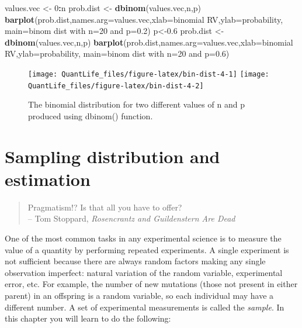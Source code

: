 \documentclass[
]{book}
\newenvironment{Shaded}{\begin{snugshade}}{\end{snugshade}}
\newcommand{\DataTypeTok}[1]{\textcolor[rgb]{0.13,0.29,0.53}{#1}}
\newcommand{\DecValTok}[1]{\textcolor[rgb]{0.00,0.00,0.81}{#1}}
\newcommand{\FloatTok}[1]{\textcolor[rgb]{0.00,0.00,0.81}{#1}}
\newcommand{\KeywordTok}[1]{\textcolor[rgb]{0.13,0.29,0.53}{\textbf{#1}}}
\newcommand{\NormalTok}[1]{#1}
\newcommand{\OperatorTok}[1]{\textcolor[rgb]{0.81,0.36,0.00}{\textbf{#1}}}
\newcommand{\StringTok}[1]{\textcolor[rgb]{0.31,0.60,0.02}{#1}}
\theoremstyle{definition}
\theoremstyle{definition}
\theoremstyle{definition}
\theoremstyle{remark}
\begin{document}
\begin{Shaded}
\begin{Highlighting}[]
\NormalTok{values.vec \textless{}{-}}\StringTok{ }\DecValTok{0}\OperatorTok{:}\NormalTok{n}
\NormalTok{prob.dist \textless{}{-}}\StringTok{ }\KeywordTok{dbinom}\NormalTok{(values.vec,n,p)}
\KeywordTok{barplot}\NormalTok{(prob.dist,}\DataTypeTok{names.arg=}\NormalTok{values.vec,}\DataTypeTok{xlab=}\StringTok{\textquotesingle{}binomial RV\textquotesingle{}}\NormalTok{,}\DataTypeTok{ylab=}\StringTok{\textquotesingle{}probability\textquotesingle{}}\NormalTok{,}
\DataTypeTok{main=}\StringTok{\textquotesingle{}binom dist with n=20 and p=0.2\textquotesingle{}}\NormalTok{)}
\NormalTok{p\textless{}{-}}\FloatTok{0.6}
\NormalTok{prob.dist \textless{}{-}}\StringTok{ }\KeywordTok{dbinom}\NormalTok{(values.vec,n,p)}
\KeywordTok{barplot}\NormalTok{(prob.dist,}\DataTypeTok{names.arg=}\NormalTok{values.vec,}\DataTypeTok{xlab=}\StringTok{\textquotesingle{}binomial RV\textquotesingle{}}\NormalTok{,}\DataTypeTok{ylab=}\StringTok{\textquotesingle{}probability\textquotesingle{}}\NormalTok{,}
\DataTypeTok{main=}\StringTok{\textquotesingle{}binom dist with n=20 and p=0.6\textquotesingle{}}\NormalTok{)}
\end{Highlighting}
\end{Shaded}

\begin{figure}

{\centering \texttt{[image: QuantLife\_files/figure-latex/bin-dist-4-1]} \texttt{[image: QuantLife\_files/figure-latex/bin-dist-4-2]} 

}

\caption{The binomial distribution for two different values of n and p produced using dbinom() function.}\label{fig:bin-dist-4}
\end{figure}

\hypertarget{sampling-distribution-and-estimation}{%
\chapter{Sampling distribution and estimation}\label{sampling-distribution-and-estimation}}

\begin{quote}
Pragmatism!? Is that all you have to offer?\\
-- Tom Stoppard, \emph{Rosencrantz and Guildenstern Are Dead}
\end{quote}

One of the most common tasks in any experimental science is to measure the value of a quantity by performing repeated experiments. A single experiment is not sufficient because there are always random factors making any single observation imperfect: natural variation of the random variable, experimental error, etc. For example, the number of new mutations (those not present in either parent) in an offspring is a random variable, so each individual may have a different number. A set of experimental measurements is called the \emph{sample}. In this chapter you will learn to do the following:
\end{document}

